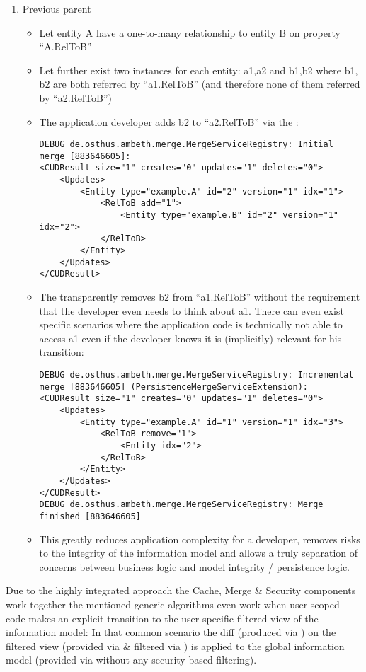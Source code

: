 \begin{enumerate}
\begin{itemize}
		\end{itemize}
	\item Previous parent
		\begin{itemize}
			\item Let entity A have a one-to-many relationship to entity B on property ``A.RelToB''
			\item Let further exist two instances for each entity: a1,a2 and b1,b2 where b1, b2 are both referred by ``a1.RelToB'' (and therefore none of them referred by ``a2.RelToB'')
			\item The application developer adds b2 to ``a2.RelToB'' via the \AMBETH{} :
\begin{lstlisting}[style=POM]		
DEBUG de.osthus.ambeth.merge.MergeServiceRegistry: Initial merge [883646605]:
<CUDResult size="1" creates="0" updates="1" deletes="0">
	<Updates>
		<Entity type="example.A" id="2" version="1" idx="1">
			<RelToB add="1">
				<Entity type="example.B" id="2" version="1" idx="2">
			</RelToB>
		</Entity>
	</Updates>
</CUDResult>
\end{lstlisting}
			\item The  transparently removes b2 from ``a1.RelToB'' without the requirement that the developer even needs to think about a1. There can even exist specific scenarios where the application code is technically not able to access a1 even if the developer knows it is (implicitly) relevant for his transition:
\begin{lstlisting}[style=POM]		
DEBUG de.osthus.ambeth.merge.MergeServiceRegistry: Incremental merge [883646605] (PersistenceMergeServiceExtension):
<CUDResult size="1" creates="0" updates="1" deletes="0">
	<Updates>
		<Entity type="example.A" id="1" version="1" idx="3">
			<RelToB remove="1">
				<Entity idx="2">
			</RelToB>
		</Entity>
	</Updates>
</CUDResult>
DEBUG de.osthus.ambeth.merge.MergeServiceRegistry: Merge finished [883646605]
\end{lstlisting}
			\item This greatly reduces application complexity for a developer, removes risks to the integrity of the information model and allows a truly separation of concerns between business logic and model integrity / persistence logic.
		\end{itemize}
\end{enumerate}
Due to the highly integrated approach the \AMBETH{} Cache, Merge \& Security components work together the mentioned generic algorithms even work when user-scoped code makes an explicit transition to the user-specific filtered view of the information model: In that common scenario the diff (produced via ) on the filtered view (provided via  \& filtered via ) is applied to the global information model (provided via  without any security-based filtering).\\

